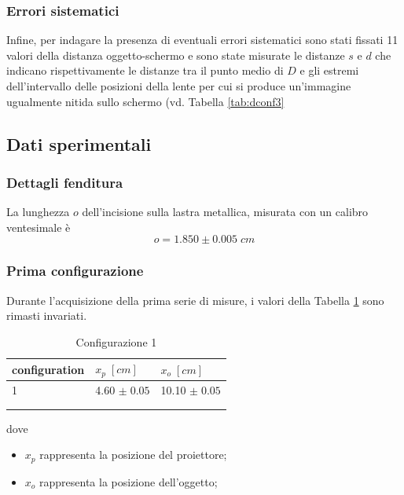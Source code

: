\documentclass[11pt,a4paper]{article}
\begin{document}
\subsubsection{Errori sistematici}
Infine, per indagare la presenza di eventuali errori sistematici sono stati fissati 11 valori della distanza oggetto-schermo e sono state misurate le distanze $s$ e $d$ che indicano rispettivamente le distanze tra il punto medio di $D$ e gli estremi dell'intervallo delle posizioni della lente per cui si produce un'immagine ugualmente nitida sullo schermo (vd. Tabella \ref{tab:dconf3}

\subsection{Dati sperimentali}

\subsubsection{Dettagli fenditura}
La lunghezza $o$ dell'incisione sulla lastra metallica, misurata con un calibro ventesimale è
\begin{equation}
    o = 1.850 \pm 0.005 \; cm
\end{equation}

\subsubsection{Prima configurazione}
Durante l'acquisizione della prima serie di misure, i valori della Tabella \ref{tab:conf1} sono rimasti invariati.
\begin{longtable}[]{@{}lll@{}}
    \toprule
    configuration & $x_p \; [cm]$ & $x_o \; [cm]$ \tabularnewline
    \midrule
    \endhead
    1 & 4.60 $\pm \; 0.05$ & 10.10 $\pm \; 0.05$ \tabularnewline
    \bottomrule
    \label{tab:conf1}
    \\
    \caption{Configurazione 1}
\end{longtable}
    
dove
\begin{itemize}
    \item $x_p$ rappresenta la posizione del proiettore;
    \item $x_o$ rappresenta la posizione dell'oggetto;
\end{itemize}
\end{document}

